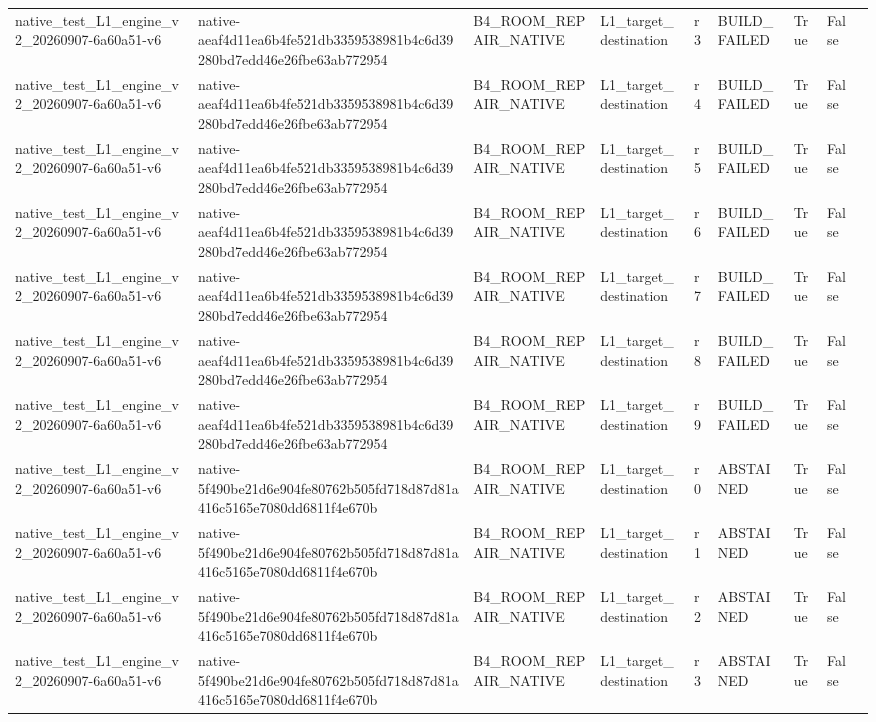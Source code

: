 \begin{tabular}{lllllllll}
native\_test\_L1\_engine\_v2\_20260907-6a60a51-v6 & native-aeaf4d11ea6b4fe521db3359538981b4c6d39280bd7edd46e26fbe63ab772954 & B4\_ROOM\_REPAIR\_NATIVE & L1\_target\_destination & r3 & BUILD\_FAILED & True & False &  \\
native\_test\_L1\_engine\_v2\_20260907-6a60a51-v6 & native-aeaf4d11ea6b4fe521db3359538981b4c6d39280bd7edd46e26fbe63ab772954 & B4\_ROOM\_REPAIR\_NATIVE & L1\_target\_destination & r4 & BUILD\_FAILED & True & False &  \\
native\_test\_L1\_engine\_v2\_20260907-6a60a51-v6 & native-aeaf4d11ea6b4fe521db3359538981b4c6d39280bd7edd46e26fbe63ab772954 & B4\_ROOM\_REPAIR\_NATIVE & L1\_target\_destination & r5 & BUILD\_FAILED & True & False &  \\
native\_test\_L1\_engine\_v2\_20260907-6a60a51-v6 & native-aeaf4d11ea6b4fe521db3359538981b4c6d39280bd7edd46e26fbe63ab772954 & B4\_ROOM\_REPAIR\_NATIVE & L1\_target\_destination & r6 & BUILD\_FAILED & True & False &  \\
native\_test\_L1\_engine\_v2\_20260907-6a60a51-v6 & native-aeaf4d11ea6b4fe521db3359538981b4c6d39280bd7edd46e26fbe63ab772954 & B4\_ROOM\_REPAIR\_NATIVE & L1\_target\_destination & r7 & BUILD\_FAILED & True & False &  \\
native\_test\_L1\_engine\_v2\_20260907-6a60a51-v6 & native-aeaf4d11ea6b4fe521db3359538981b4c6d39280bd7edd46e26fbe63ab772954 & B4\_ROOM\_REPAIR\_NATIVE & L1\_target\_destination & r8 & BUILD\_FAILED & True & False &  \\
native\_test\_L1\_engine\_v2\_20260907-6a60a51-v6 & native-aeaf4d11ea6b4fe521db3359538981b4c6d39280bd7edd46e26fbe63ab772954 & B4\_ROOM\_REPAIR\_NATIVE & L1\_target\_destination & r9 & BUILD\_FAILED & True & False &  \\
native\_test\_L1\_engine\_v2\_20260907-6a60a51-v6 & native-5f490be21d6e904fe80762b505fd718d87d81a416c5165e7080dd6811f4e670b & B4\_ROOM\_REPAIR\_NATIVE & L1\_target\_destination & r0 & ABSTAINED & True & False &  \\
native\_test\_L1\_engine\_v2\_20260907-6a60a51-v6 & native-5f490be21d6e904fe80762b505fd718d87d81a416c5165e7080dd6811f4e670b & B4\_ROOM\_REPAIR\_NATIVE & L1\_target\_destination & r1 & ABSTAINED & True & False &  \\
native\_test\_L1\_engine\_v2\_20260907-6a60a51-v6 & native-5f490be21d6e904fe80762b505fd718d87d81a416c5165e7080dd6811f4e670b & B4\_ROOM\_REPAIR\_NATIVE & L1\_target\_destination & r2 & ABSTAINED & True & False &  \\
native\_test\_L1\_engine\_v2\_20260907-6a60a51-v6 & native-5f490be21d6e904fe80762b505fd718d87d81a416c5165e7080dd6811f4e670b & B4\_ROOM\_REPAIR\_NATIVE & L1\_target\_destination & r3 & ABSTAINED & True & False &  \\

\end{tabular}
